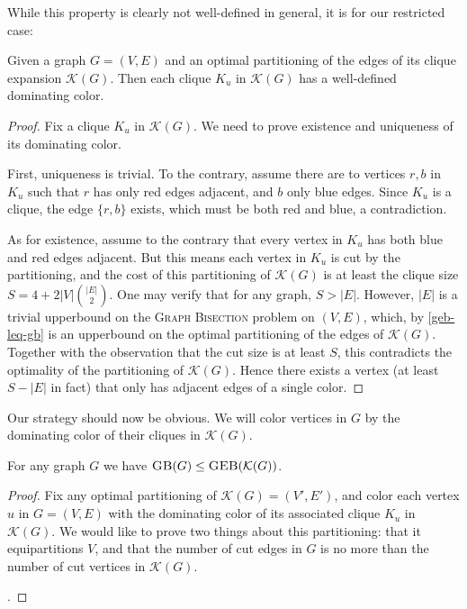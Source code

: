 \documentclass{article}
\newcommand{\gb}{\textsc{Graph \allowbreak Bisection} }
\newcommand{\sgeb}{\textsc{GEB} }
\newcommand{\sgb}{\textsc{GB} }
\begin{document}
	While this property is clearly not well-defined in general, it is for our
	restricted case:

	\begin{lemma}
		\label{dom-col}
		Given a graph $G = (V, E)$ and an optimal partitioning of the edges
		of its clique
		expansion $\mathcal{K}(G)$. Then each clique $K_u$ in $\mathcal{K}(G)$
		has a well-defined dominating color.
	\end{lemma}
	\begin{proof}
		Fix a clique $K_u$ in $\mathcal{K}(G)$. We need to prove existence and
		uniqueness of its dominating color.

		First, uniqueness is trivial. To the contrary, assume there are to
		vertices $r, b$ in $K_u$ such that $r$ has only red edges adjacent,
		and $b$ only blue edges. Since $K_u$ is a clique, the edge $\{r, b\}$
		exists, which must be both red and blue, a contradiction.

		As for existence, assume to the contrary that every vertex in $K_u$
		has both blue and red edges adjacent. But this means each vertex in
		$K_u$ is cut by the partitioning, and the cost of this partitioning
		of $\mathcal{K}(G)$ is at least the clique size
		$S = 4+2|V|\binom{|E|}{2}$. One may verify that for any graph,
		$S > |E|$. However, $|E|$ is a trivial upperbound on the \gb problem
		on $(V, E)$, which, by \ref{geb-leq-gb} is an upperbound on the optimal
		partitioning of the edges of $\mathcal{K}(G)$. Together with the
		observation that the cut size is at least $S$, this contradicts the
		optimality of the partitioning of $\mathcal{K}(G)$. Hence there exists
		a vertex (at least $S-|E|$ in fact) that only has adjacent edges of
		a single color.
	\end{proof}

	Our strategy should now be obvious. We will color vertices in $G$ by
	the dominating color of their cliques in $\mathcal{K}(G)$.

	\begin{proposition}
		\label{gb-leq-geb}
		For any graph $G$ we have $\sgb(G) \leq \sgeb(\mathcal{K}(G))$.
	\end{proposition}
	\begin{proof}
		Fix any optimal partitioning of $\mathcal{K}(G) = (V', E')$, and
		color each vertex $u$ in $G = (V, E)$ with the dominating color of
		its associated clique $K_u$ in $\mathcal{K}(G)$. We would like to
		prove two things about this partitioning: that it equipartitions $V$,
		and that the number of cut edges in $G$ is no more than the number of
		cut vertices in $\mathcal{K}(G)$.

		.
	\end{proof}
\end{document}
